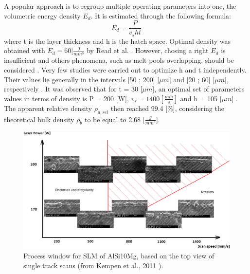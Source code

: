 A popular approach is to regroup multiple operating parameters into one, the volumetric energy density $E_d$. It is estimated through the following formula: 
$$E_d=\frac{P}{v_s h t} $$
where t is the layer thickness and h is the hatch space. Optimal density was obtained with $E_d=60 [\frac{J}{mm^3}$ by Read et al. \parencite{Read150417}. However, chosing a right $E_d$ is insufficient and others phenomena, such as melt pools overlapping, should be considered \parencite{Tang170309}. Very few studies were carried out to optimize h and t independently. Their values lie generally in the intervals [50 ; 200] [$\mu m$] and [20 ; 60] [$\mu m$], respectively \parencite{aboulkhair2016,Brandl121509,Kempen110817,Mertens170406}. It was observed that for t = 30 [$\mu m$], an optimal set of parameters values in terms of density is P = 200 [W], $v_s=1400 [\frac{mm}{s}]$ and h = 105 [$\mu m$] \parencite{Kempen110817}. The apparent relative density $\rho_{a,rel}$ then reached 99.4 [\%], considering the theoretical bulk density $\rho_b$ to be equal to 2.68 [$\frac{g}{mm^3}$].\\

\begin{figure}[ht]
\centering
\includegraphics[scale=0.34]{Images/Pvs}
\decoRule
\caption[Process window for SLM of AlSi10Mg, based on the top view of single track scans]{Process window for SLM of AlSi10Mg, based on the top view of single track scans (from Kempen et al., 2011 \parencite{Kempen110817}).}
\label{fig:Pvs}
\end{figure}

